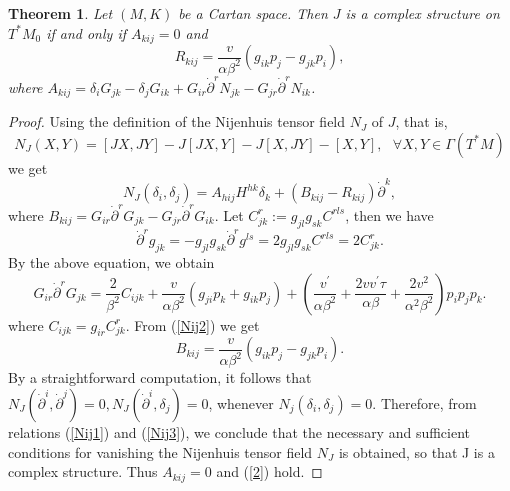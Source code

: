 \documentclass[10pt,a4paper]{article}
\theoremstyle{plain}
\newtheorem{theorem}{Theorem}[section]
\theoremstyle{definition}
\begin{document}
\smallskip

\begin{theorem}\label{3.3}
Let $(M, K)$ be a Cartan space. Then $J$ is a complex structure on
$T^{\ast}M_0$ if and only if $A_{kij}=0$ and
\begin{equation}
R_{kij}=\frac{v}{\alpha\beta^2}(g_{ik}p_j-g_{jk}p_i),\label{2}
\end{equation}
where $A_{kij}=\delta_i G_{jk}-\delta_j
G_{ik}+G_{ir}{\dot{\partial}}^rN_{jk}-G_{jr}{\dot{\partial}}^rN_{ik}$.
\end{theorem}\label{th1}
\begin{proof}
Using the definition of the Nijenhuis tensor field $N_J$ of $J$, that is,
\[
N_J(X,Y)=[JX,JY]-J[JX,Y]-J[X,JY]-[X,Y],\ \ \ \forall X, Y\in
\Gamma(T^{\ast}M)
\]
we get
\begin{equation}
N_J(\delta_i,\delta_j)=A_{hij}H^{hk}\delta_k+
(B_{kij}-R_{kij}){\dot{\partial}}^k,\label{Nij1}
\end{equation}
where
$B_{kij}=G_{ir}{\dot{\partial}}^rG_{jk}-G_{jr}{\dot{\partial}}^rG_{ik}$. Let $C_{jk}^r:=g_{jl}g_{sk}C^{rls}$, then we have
\[
{\dot{\partial}}^rg_{jk}=-g_{jl}g_{sk}{\dot{\partial}}^rg^{ls}=2g_{jl}g_{sk}C^{rls}=2C_{jk}^r.
\]
By the above equation, we obtain
\begin{equation}
G_{ir}{\dot{\partial}}^rG_{jk}=\frac{2}{\beta^2}C_{ijk}
+\frac{v}{\alpha\beta^2}(g_{ji}p_k+g_{ik}p_j)
+(\frac{v^{\prime}}{\alpha\beta^2}+\frac{2vv^{\prime}\tau}{\alpha\beta}+\frac{2v^2}{\alpha^2\beta^2})p_ip_jp_k.\label{Nij2}
\end{equation}
where $C_{ijk}=g_{ir}C_{jk}^r$. From (\ref{Nij2}) we get
\begin{equation}
B_{kij}=\frac{v}{\alpha\beta^2}(g_{ik}p_j-g_{jk}p_i).\label{Nij3}
\end{equation}
By a straightforward computation, it follows that
$N_J({\dot{\partial}}^i,{\dot{\partial}}^j)=0,
N_J({\dot{\partial}}^i,\delta_j)=0$, whenever
$N_j(\delta_i,\delta_j)=0$. Therefore, from relations (\ref{Nij1})
and (\ref{Nij3}), we conclude that the necessary and sufficient
conditions for  vanishing the Nijenhuis tensor field $N_J$ is obtained,  so that J
is a complex structure. Thus $A_{kij}=0$ and (\ref{2}) hold.
\end{proof}

\bigskip
\end{document}
